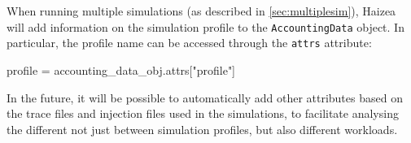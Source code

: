 When running multiple simulations (as described in \ref{sec:multiplesim}), Haizea will add information on the simulation profile to the \texttt{AccountingData} object. In particular, the profile name can be accessed through the \texttt{attrs} attribute:

\begin{wideshellverbatim}
profile = accounting_data_obj.attrs["profile"]
\end{wideshellverbatim}

In the future, it will be possible to automatically add other attributes based on the trace files and injection files used in the simulations, to facilitate analysing the different not just between simulation profiles, but also different workloads.
